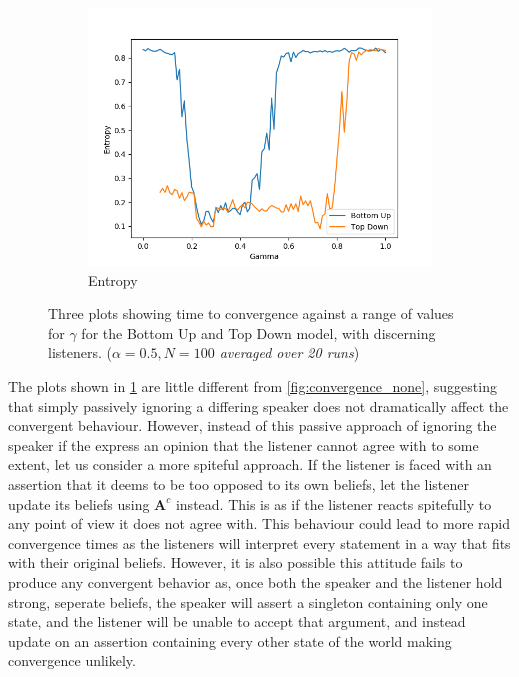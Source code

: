 \begin{figure}[H]
\begin{subfigure}[ht]{0.45\textwidth}
    \includegraphics[width=\textwidth]{Images/Figures/All/FIE_ALL_n_3_p_100_gamm_0,5_alpha_0,5.png}
    \caption{Entropy}
 \end{subfigure}

 \caption{Three plots showing time to convergence against a range of values for $\gamma$ for the Bottom Up and Top Down model, with discerning listeners. (\textit{$\alpha = 0.5, N = 100$ averaged over 20 runs})}\label{fig:convergence_FIE}
\end{figure}

The plots shown in \cref{fig:convergence_FIE} are little different from \cref{fig:convergence_none}, suggesting that simply passively ignoring a differing speaker does not dramatically affect the convergent behaviour. However, instead of this passive approach of ignoring the speaker if the express an opinion that the listener cannot agree with to some extent, let us consider a more spiteful approach. If the listener is faced with an assertion that it deems to be too opposed to its own beliefs, let the listener update its beliefs using $\mathbf{A}^c$ instead. This is as if the listener reacts spitefully to any point of view it does not agree with. This behaviour could lead to more rapid convergence times as the listeners will interpret every statement in a way that fits with their original beliefs. However, it is also possible this attitude fails to produce any convergent behavior as, once both the speaker and the listener hold strong, seperate beliefs, the speaker will assert a singleton containing only one state, and the listener will be unable to accept that argument, and instead update on an assertion containing every other state of the world making convergence unlikely. 